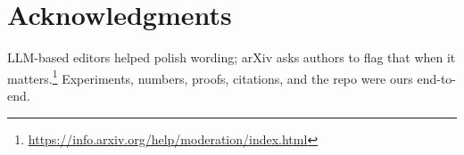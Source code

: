 \section*{Acknowledgments}
LLM-based editors helped polish wording; arXiv asks authors to flag that when it matters.\footnote{\url{https://info.arxiv.org/help/moderation/index.html}} Experiments, numbers, proofs, citations, and the repo were ours end-to-end.
